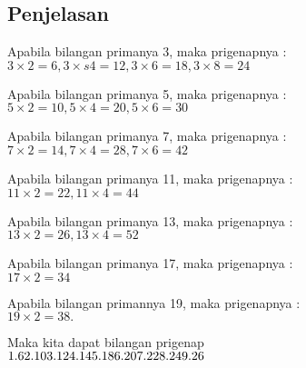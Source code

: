\documentclass{article}
\begin{document}
\subsection*{Penjelasan}
Apabila bilangan primanya 3, maka prigenapnya : \\
$3 \times 2 = 6, 3\times  s4 = 12, 3\times6 = 18, 3\times 8 = 24 $

Apabila bilangan primanya 5, maka prigenapnya :\\
$5 \times 2 = 10, 5 \times 4 = 20, 5\times 6 = 30$

Apabila bilangan primanya 7, maka prigenapnya :\\
$7 \times 2 = 14, 7 \times 4 = 28, 7 \times 6 = 42$

Apabila bilangan primanya 11, maka prigenapnya : \\
$ 11 \times 2 = 22, 11 \times 4 = 44 $

Apabila bilangan primanya 13, maka prigenapnya :\\
$ 13 \times 2 = 26, 13 \times  4 = 52 $

Apabila bilangan primanya 17, maka prigenapnya : \\
$ 17 \times 2 = 34$

Apabila bilangan primannya 19, maka prigenapnya :\\
$ 19 \times 2 = 38. $

Maka kita dapat bilangan prigenap \\

$
1. 6\\
2. 10\\
3. 12\\
4. 14\\
5. 18\\
6. 20\\
7. 22\\
8. 24\\
9. 26\\
$


\pagebreak
\end{document}

